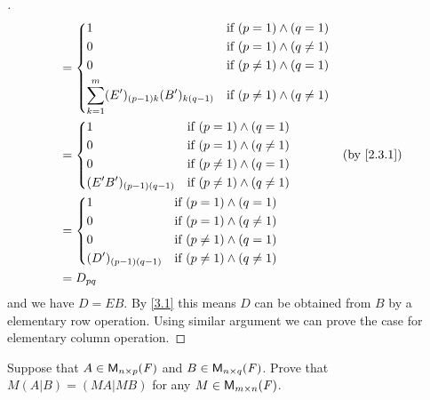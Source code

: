 \begin{proof}[]
\begin{align*}
     & = \begin{dcases}
           1                                                & \text{if } (p = 1) \land (q = 1)       \\
           0                                                & \text{if } (p = 1) \land (q \neq 1)    \\
           0                                                & \text{if } (p \neq 1) \land (q = 1)    \\
           \sum_{k = 1}^m (E')_{(p - 1) k} (B')_{k (q - 1)} & \text{if } (p \neq 1) \land (q \neq 1)
         \end{dcases}                                      \\
     & = \begin{dcases}
           1                         & \text{if } (p = 1) \land (q = 1)       \\
           0                         & \text{if } (p = 1) \land (q \neq 1)    \\
           0                         & \text{if } (p \neq 1) \land (q = 1)    \\
           (E' B')_{(p - 1) (q - 1)} & \text{if } (p \neq 1) \land (q \neq 1)
         \end{dcases}                              &  & \text{(by \cref{2.3.1})}                                                        \\
     & = \begin{dcases}
           1                      & \text{if } (p = 1) \land (q = 1)       \\
           0                      & \text{if } (p = 1) \land (q \neq 1)    \\
           0                      & \text{if } (p \neq 1) \land (q = 1)    \\
           (D')_{(p - 1) (q - 1)} & \text{if } (p \neq 1) \land (q \neq 1)
         \end{dcases}                                                                \\
     & = D_{p q}
  \end{align*}
  and we have \(D = EB\).
  By \cref{3.1} this means \(D\) can be obtained from \(B\) by a elementary row operation.
  Using similar argument we can prove the case for elementary column operation.
\end{proof}

\begin{ex}\label{ex:3.2.15}
  Suppose that \(A \in \mathsf{M}_{{n} \times p}({\mathit{F}})\) and \(B \in \mathsf{M}_{{n} \times q}({\mathit{F}})\).
  Prove that \(M (A | B) = (MA | MB)\) for any \(M \in \mathsf{M}_{{m} \times n}({\mathit{F}})\).
\end{ex}

